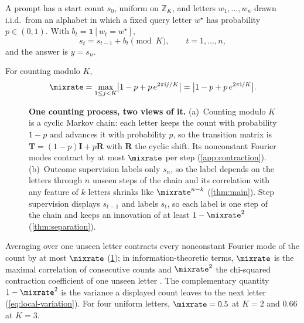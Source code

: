 \begin{definition}
\label{def:task}
A prompt has a start count $s_0$, uniform on $\mathbb Z_K$, and letters $w_1,\ldots,w_n$ drawn i.i.d.\ from an alphabet
in which a fixed query letter $w^\star$ has probability $p\in(0,1)$. With $b_t=\mathbf 1[w_t=w^\star]$,
\begin{equation}
 s_t=s_{t-1}+b_t\pmod K,\qquad t=1,\ldots,n,
 \label{eq:tracking}
\end{equation}
and the answer is $y=s_n$.
\end{definition}

\begin{definition}
\label{def:lambda}
For counting modulo $K$,
\begin{equation}
 \mixrate=\max_{1\le j<K}\bigl|1-p+p\,e^{2\pi\mathrm ij/K}\bigr|=\bigl|1-p+p\,e^{2\pi\mathrm i/K}\bigr|.
 \label{eq:lambda}
\end{equation}
\end{definition}

\begin{figure}[t]
\centering
\resizebox{\linewidth}{!}{}
\caption{\textbf{One counting process, two views of it.}
(a)~Counting modulo $K$ is a cyclic Markov chain: each letter keeps the count with probability $1-p$ and advances it with probability
$p$, so the transition matrix is $\mathbf T=(1-p)\mathbf I+p\mathbf R$ with $\mathbf R$ the cyclic shift. Its nonconstant Fourier modes
contract by at most $\mixrate$ per step (\cref{app:contraction}).
(b)~Outcome supervision labels only $s_n$, so the label depends on the letters through $n$ unseen steps of the chain and its
correlation with any feature of $k$ letters shrinks like $\mixrate^{n-k}$ (\cref{thm:main}). Step supervision displays $s_{t-1}$ and labels $s_t$, so each label is one
step of the chain and keeps an innovation of at least $1-\mixrate^2$ (\cref{thm:separation}).}
\label{fig:chain}
\end{figure}

Averaging over one unseen letter contracts every nonconstant Fourier mode of the count by at most $\mixrate$ (\cref{fig:chain}); in information-theoretic terms,
$\mixrate$ is the maximal correlation of consecutive counts and $\mixrate^2$ the chi-squared contraction coefficient of one
unseen letter \citep{witsenhausen1975sequences,raginsky2016strong}. The complementary quantity $1-\mixrate^2$ is the
variance a displayed count leaves to the next letter (\cref{eq:local-variation}). For four uniform letters,
$\mixrate=0.5$ at $K=2$ and $0.66$ at $K=3$.

